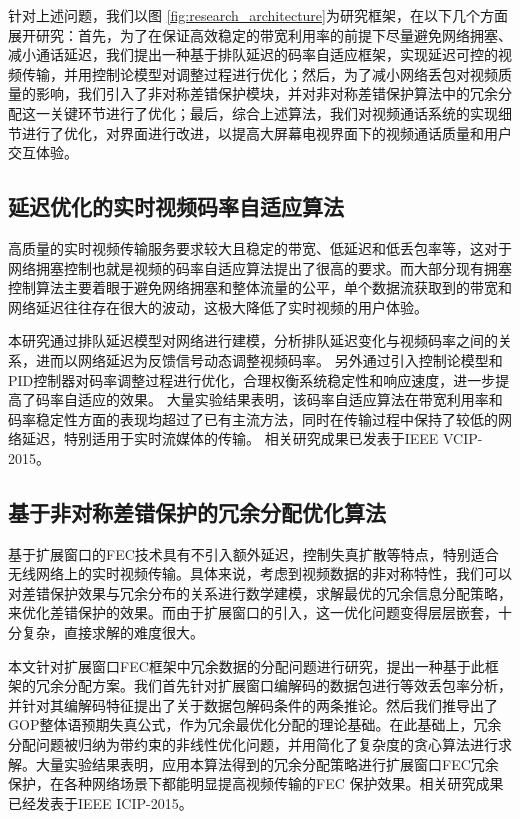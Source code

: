 针对上述问题，我们以图 \ref{fig:research_architecture}为研究框架，在以下几个方面展开研究：首先，为了在保证高效稳定的带宽利用率的前提下尽量避免网络拥塞、减小通话延迟，我们提出一种基于排队延迟的码率自适应框架，实现延迟可控的视频传输，并用控制论模型对调整过程进行优化；然后，为了减小网络丢包对视频质量的影响，我们引入了非对称差错保护模块，并对非对称差错保护算法中的冗余分配这一关键环节进行了优化；最后，综合上述算法，我们对视频通话系统的实现细节进行了优化，对界面进行改进，以提高大屏幕电视界面下的视频通话质量和用户交互体验。

\subsection{延迟优化的实时视频码率自适应算法}
高质量的实时视频传输服务要求较大且稳定的带宽、低延迟和低丢包率等，这对于网络拥塞控制也就是视频的码率自适应算法提出了很高的要求。而大部分现有拥塞控制算法主要着眼于避免网络拥塞和整体流量的公平，单个数据流获取到的带宽和网络延迟往往存在很大的波动，这极大降低了实时视频的用户体验。

本研究通过排队延迟模型对网络进行建模，分析排队延迟变化与视频码率之间的关系，进而以网络延迟为反馈信号动态调整视频码率。
另外通过引入控制论模型和PID控制器对码率调整过程进行优化，合理权衡系统稳定性和响应速度，进一步提高了码率自适应的效果。
大量实验结果表明，该码率自适应算法在带宽利用率和码率稳定性方面的表现均超过了已有主流方法，同时在传输过程中保持了较低的网络延迟，特别适用于实时流媒体的传输。
相关研究成果已发表于IEEE VCIP-2015。

\subsection{基于非对称差错保护的冗余分配优化算法}
基于扩展窗口的FEC技术具有不引入额外延迟，控制失真扩散等特点，特别适合无线网络上的实时视频传输。具体来说，考虑到视频数据的非对称特性，我们可以对差错保护效果与冗余分布的关系进行数学建模，求解最优的冗余信息分配策略，来优化差错保护的效果。而由于扩展窗口的引入，这一优化问题变得层层嵌套，十分复杂，直接求解的难度很大。

本文针对扩展窗口FEC框架中冗余数据的分配问题进行研究，提出一种基于此框架的冗余分配方案。我们首先针对扩展窗口编解码的数据包进行等效丢包率分析，并针对其编解码特征提出了关于数据包解码条件的两条推论。然后我们推导出了GOP整体语预期失真公式，作为冗余最优化分配的理论基础。在此基础上，冗余分配问题被归纳为带约束的非线性优化问题，并用简化了复杂度的贪心算法进行求解。大量实验结果表明，应用本算法得到的冗余分配策略进行扩展窗口FEC冗余保护，在各种网络场景下都能明显提高视频传输的FEC 保护效果。相关研究成果已经发表于IEEE ICIP-2015。

